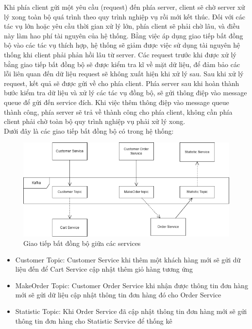 Khi phía client gửi một yêu cầu (request) đến phía server, client sẽ chờ server xử lý xong toàn bộ quá trình theo quy trình nghiệp vụ rồi mới kết thúc. Đối với các tác vụ lớn hoặc yêu cầu thời gian xử lý lớn, phía client sẽ phải chờ lâu, và điều này làm hao phí tài nguyên của hệ thống. Bằng việc áp dụng giao tiếp bất đồng bộ vào các tác vụ thích hợp, hệ thống sẽ giảm được việc sử dụng tài nguyên hệ thống khi client phải phản hồi lâu từ server. Các request trước khi được xử lý bằng giao tiếp bất đồng bộ sẽ được kiểm tra kĩ về mặt dữ liệu, để đảm bảo các lỗi liên quan đến dữ liệu request sẽ không xuất hiện khi xử lý sau. Sau khi xử lý request, kết quả sẽ được gửi về cho phía client. Phía server sau khi hoàn thành bước kiểm tra dữ liệu và xử lý các tác vụ đồng bộ, sẽ gửi thông điệp vào message queue để gửi đến service đích. Khi việc thêm thông điệp vào message queue thành công, phía server sẽ trả về thành công cho phía client, không cần phía client phải chờ toàn bộ quy trình nghiệp vụ phải xử lý xong.\\

Dưới đây là các giao tiếp bất đồng bộ có trong hệ thống:

\begin{figure}[!htp]
	\centering
	\includegraphics[width=13cm]{img/Architecture/kafka.png}
	\newline
	\caption{Giao tiếp bất đồng bộ giữa các services}
\end{figure}

\begin{itemize}
	\item Customer Topic: Customer Service khi thêm một khách hàng mới sẽ gửi dữ liệu đến để Cart Service cập nhật thêm giỏ hàng tương ứng
	\item MakeOrder Topic: Customer Order Service khi nhận được thông tin đơn hàng mới sẽ gửi dữ liệu cập nhật thông tin đơn hàng đó cho Order Service
	\item Statistic Topic: Khi Order Service đã cập nhật thông tin đơn hàng mới sẽ gửi thông tin đơn hàng cho Statistic Service để thống kê
\end{itemize}